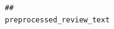 \documentclass[
  a4paper,
]{article}
\begin{document}
\begin{verbatim}
##                                                                                                                                                                                                                                                                                                                                                                                                                                                                                                                                                                                                                                                                                                                                                                                                                                                                                                                                                                                                                                                                                                                                                                                                                                                                                                                                                                                                                                                                                                                                                                                                                                                                                                                                                                                                                                                                                                                                                                                                                                                                                                                                           preprocessed_review_text

\end{verbatim}
\end{document}

